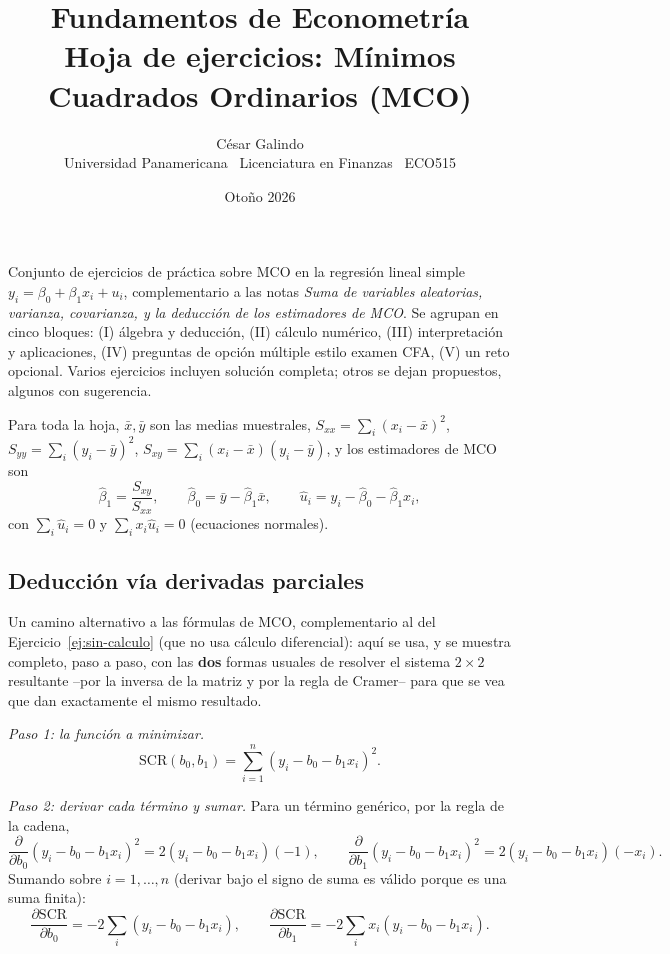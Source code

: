 \documentclass[11pt,a4paper,oneside]{article}
\title{\vspace{-1.5cm}\textbf{\Large Fundamentos de Econometría}\\[2pt]
\large Hoja de ejercicios: Mínimos Cuadrados Ordinarios (MCO)}
\author{César Galindo\\ \small Universidad Panamericana \textperiodcentered\ Licenciatura en Finanzas \textperiodcentered\ ECO515}
\date{\small Otoño 2026}
\theoremstyle{plain}
\theoremstyle{definition}
\newcommand{\SCR}{\mathrm{SCR}}
\begin{document}
\maketitle
\vspace{-0.8cm}
\tableofcontents
\vspace{0.3cm}

\begin{ideaBox}
Conjunto de ejercicios de práctica sobre MCO en la regresión lineal
simple $y_i=\beta_0+\beta_1x_i+u_i$, complementario a las notas
\emph{Suma de variables aleatorias, varianza, covarianza, y la deducción
de los estimadores de MCO}. Se agrupan en cinco bloques: (I) álgebra y
deducción, (II) cálculo numérico, (III) interpretación y aplicaciones,
(IV) preguntas de opción múltiple estilo examen CFA, (V) un reto
opcional. Varios ejercicios incluyen solución completa; otros se dejan
propuestos, algunos con sugerencia.
\end{ideaBox}

\begin{summaryBox}
Para toda la hoja, $\bar x,\bar y$ son las medias muestrales,
$S_{xx}=\sum_i(x_i-\bar x)^2$, $S_{yy}=\sum_i(y_i-\bar y)^2$,
$S_{xy}=\sum_i(x_i-\bar x)(y_i-\bar y)$, y los estimadores de MCO son
\[
  \hat\beta_1 = \frac{S_{xy}}{S_{xx}}, \qquad
  \hat\beta_0 = \bar y - \hat\beta_1\bar x, \qquad
  \hat u_i = y_i-\hat\beta_0-\hat\beta_1x_i,
\]
con $\sum_i \hat u_i=0$ y $\sum_i x_i\hat u_i=0$ (ecuaciones normales).
\end{summaryBox}

\subsection*{Deducción vía derivadas parciales}

Un camino alternativo a las fórmulas de MCO, complementario al del
Ejercicio~\ref{ej:sin-calculo} (que no usa cálculo diferencial): aquí se
usa, y se muestra completo, paso a paso, con las \textbf{dos} formas
usuales de resolver el sistema $2\times2$ resultante --por la inversa de
la matriz y por la regla de Cramer-- para que se vea que dan exactamente
el mismo resultado.

\emph{Paso 1: la función a minimizar.}
\[
  \SCR(b_0,b_1)=\sum_{i=1}^n(y_i-b_0-b_1x_i)^2 .
\]

\emph{Paso 2: derivar cada término y sumar.} Para un término genérico,
por la regla de la cadena,
\[
  \frac{\partial}{\partial b_0}(y_i-b_0-b_1x_i)^2 = 2(y_i-b_0-b_1x_i)(-1),
  \qquad
  \frac{\partial}{\partial b_1}(y_i-b_0-b_1x_i)^2 = 2(y_i-b_0-b_1x_i)(-x_i).
\]
Sumando sobre $i=1,\dots,n$ (derivar bajo el signo de suma es válido
porque es una suma finita):
\[
  \frac{\partial \SCR}{\partial b_0}=-2\sum_i(y_i-b_0-b_1x_i), \qquad
  \frac{\partial \SCR}{\partial b_1}=-2\sum_ix_i(y_i-b_0-b_1x_i).
\]
\end{document}
